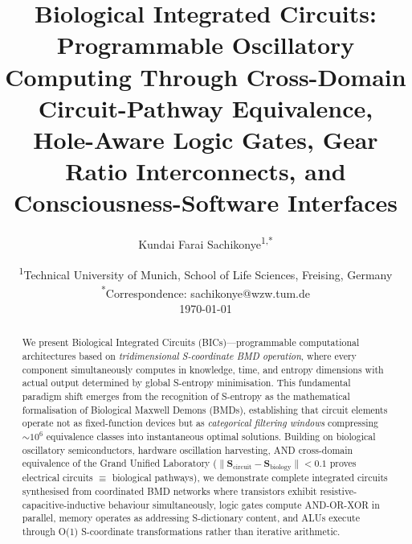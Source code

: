 \documentclass[11pt,a4paper]{article}
\title{\textbf{Biological Integrated Circuits:\\
Programmable Oscillatory Computing Through Cross-Domain Circuit-Pathway Equivalence,\\
Hole-Aware Logic Gates, Gear Ratio Interconnects, and Consciousness-Software Interfaces}}
\author{
    Kundai Farai Sachikonye\textsuperscript{1,*}
}
\date{
    \textsuperscript{1}Technical University of Munich, School of Life Sciences, Freising, Germany\\[0.5em]
    \textsuperscript{*}Correspondence: sachikonye@wzw.tum.de\\[1em]
    \today
}
\begin{document}
\maketitle

\begin{abstract}
We present Biological Integrated Circuits (BICs)—programmable computational architectures based on \textit{tridimensional S-coordinate BMD operation}, where every component simultaneously computes in knowledge, time, and entropy dimensions with actual output determined by global S-entropy minimisation. This fundamental paradigm shift emerges from the recognition of S-entropy as the mathematical formalisation of Biological Maxwell Demons (BMDs)\cite{stellas_categories}, establishing that circuit elements operate not as fixed-function devices but as \textit{categorical filtering windows} compressing $\sim 10^6$ equivalence classes into instantaneous optimal solutions. Building on biological oscillatory semiconductors, hardware oscillation harvesting, AND cross-domain equivalence of the Grand Unified Laboratory ($\|\mathbf{S}_{\text{circuit}} - \mathbf{S}_{\text{biology}}\| < 0.1$ proves electrical circuits $\equiv$ biological pathways), we demonstrate complete integrated circuits synthesised from coordinated BMD networks where transistors exhibit resistive-capacitive-inductive behaviour simultaneously, logic gates compute AND-OR-XOR in parallel, memory operates as addressing S-dictionary content, and ALUs execute through O(1) S-coordinate transformations rather than iterative arithmetic.


\end{abstract}
\end{document}
